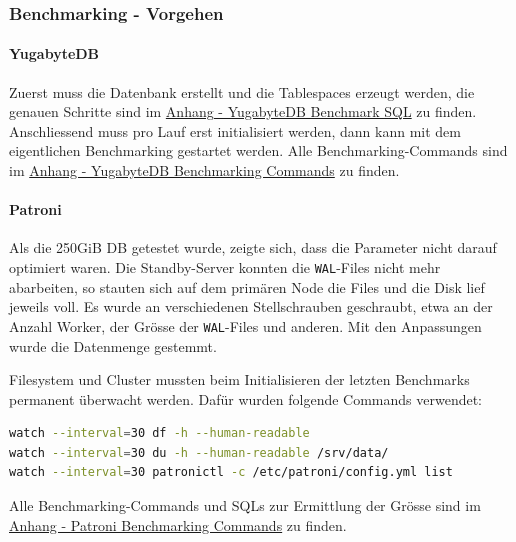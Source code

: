 
\begin{flushleft}
    \subsubsection{Benchmarking - Vorgehen}
    \paragraph{YugabyteDB}
    Zuerst muss die Datenbank erstellt und die Tablespaces erzeugt werden, die genauen Schritte sind im \hyperref[subsubsec:yugabytedb_benchmarking_sql]{Anhang - YugabyteDB Benchmark SQL} zu finden.
    Anschliessend muss pro Lauf erst initialisiert werden, dann kann mit dem eigentlichen Benchmarking gestartet werden.
    Alle Benchmarking-Commands sind im \hyperref[subsec:yugabytedb_benchmarking_commands]{Anhang - YugabyteDB Benchmarking Commands} zu finden.
    \paragraph{Patroni}
    Als die 250GiB DB getestet wurde, zeigte sich, dass die Parameter nicht darauf optimiert waren.
    Die Standby-Server konnten die \texttt{WAL}-Files nicht mehr abarbeiten, so stauten sich auf dem primären Node die Files und die Disk lief jeweils voll.
    Es wurde an verschiedenen Stellschrauben geschraubt, etwa an der Anzahl Worker, der Grösse der \texttt{WAL}-Files und anderen.
    Mit den Anpassungen wurde die Datenmenge gestemmt.
\end{flushleft}
\begin{flushleft}
    Filesystem und Cluster mussten beim Initialisieren der letzten Benchmarks permanent überwacht werden.
    Dafür wurden folgende Commands verwendet:
\lstset{style=gra_codestyle}
\begin{lstlisting}[language=bash, caption=Patroni - Benchmarking - Monitoring,captionpos=b,label={lst:benchmarking_patroni_monitoring},breaklines=true]
watch --interval=30 df -h --human-readable
watch --interval=30 du -h --human-readable /srv/data/
watch --interval=30 patronictl -c /etc/patroni/config.yml list
\end{lstlisting}
\end{flushleft}
\begin{flushleft}
    Alle Benchmarking-Commands und SQLs zur Ermittlung der Grösse sind im \hyperref[subsec:patroni_benchmarking_commands]{Anhang - Patroni Benchmarking Commands} zu finden.
\end{flushleft}

